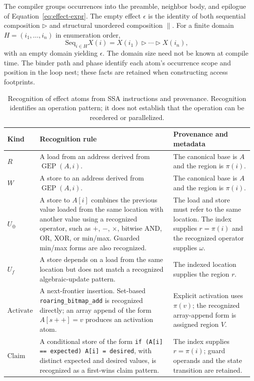 The compiler groups occurrences into the preamble, neighbor body, and
epilogue of Equation~\ref{eq:effect-expr}. The empty effect $\epsilon$ is
the identity of both sequential composition $\triangleright$ and
structural unordered composition $\parallel$. For a finite domain
$H=(i_1,\ldots,i_n)$ in enumeration order,
\[
\mathrm{Seq}_{i\in H}X(i)
=X(i_1)\triangleright\cdots\triangleright X(i_n),
\]
with an empty domain yielding $\epsilon$. The domain size need not be
known at compile time. The binder path and phase identify each atom's
occurrence scope and position in the loop nest; these facts are retained
when constructing access footprints.

\begin{table}[t]
\small
\centering
\caption{Recognition of effect atoms from SSA instructions and provenance.
Recognition identifies an operation pattern; it does not establish that
the operation can be reordered or parallelized.}
\label{tab:effect-recognition}
\begin{tabularx}{\textwidth}{lXX}
\toprule
\textbf{Kind} & \textbf{Recognition rule} & \textbf{Provenance and metadata} \\
\midrule
$R$
& A load from an address derived from $\operatorname{GEP}(A,i)$.
& The canonical base is $A$ and the region is $\pi(i)$. \\
$W$
& A store to an address derived from $\operatorname{GEP}(A,i)$.
& The canonical base is $A$ and the region is $\pi(i)$. \\
$U_{\oplus}$
& A store to $A[i]$ combines the previous value loaded from the same
location with another value using a recognized operator, such as
$+$, $-$, $\times$, bitwise AND, OR, XOR, or min/max. Guarded min/max
forms are also recognized.
& The load and store must refer to the same location. The index supplies
$r=\pi(i)$ and the recognized operator supplies $\omega$. \\
$U_f$
& A store depends on a load from the same location but does not match a
recognized algebraic-update pattern.
& The indexed location supplies the region $r$. \\
$\mathrm{Activate}$
& A next-frontier insertion. Set-based
\texttt{roaring\_bitmap\_add} is recognized directly; an array append
of the form $A[s{+}{+}]=v$ produces an activation atom.
& Explicit activation uses $\pi(v)$; the recognized array-append form
is assigned region $V$. \\
$\mathrm{Claim}$
& A conditional store of the form
\texttt{if (A[i] == expected) A[i] = desired}, with distinct expected
and desired values, is recognized as a first-wins claim pattern.
& The index supplies $r=\pi(i)$; guard operands and the state transition
are retained. \\
\bottomrule
\end{tabularx}
\end{table}

